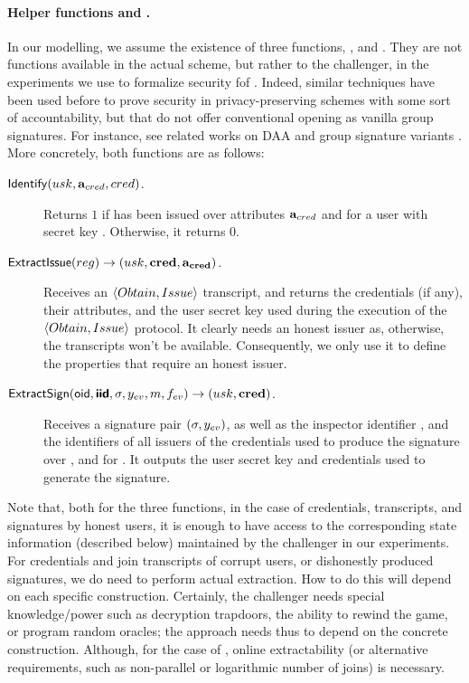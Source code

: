 \paragraph{Helper functions \ExtractIssue and \ExtractSign.} In our modelling,
we assume the existence of three functions, \Identify, \ExtractIssue and
\ExtractSign. They are not functions available in the actual scheme, but rather
to the challenger, in the experiments we use to formalize security fof \UAS.
Indeed, similar techniques have been used before to prove security in
privacy-preserving schemes with some sort of accountability, but that do not
offer conventional opening as vanilla group signatures. For instance, see
related works on DAA \cite{bfg+11,cdl16} and group signature variants
\cite{dl21,fgl21,gl19,lnpy21}. More concretely, both functions are as follows:

\begin{description}
\item[$\mathsf{Identify}(usk,\mathbf{a}_{cred},cred)$.] Returns $1$ if \cred has been
  issued over attributes $\mathbf{a}_{cred}$ and for a user with secret key \usk.
  Otherwise, it returns $0$.
\item[$\mathsf{ExtractIssue}(reg) \rightarrow (usk,\mathbf{cred},\mathbf{a}_{\mathbf{cred}})$.]
  Receives an $\langle Obtain, Issue \rangle$ transcript, and returns the
  credentials (if any), their attributes, and the user secret key used during
  the execution of the $\langle Obtain,Issue\rangle$ protocol. It clearly needs
  an honest issuer as, otherwise, the transcripts won't be available.
  Consequently, we only use it to define the properties that require an honest
  issuer.
\item[$\mathsf{ExtractSign}(\mathsf{oid},\boldsymbol{\mathsf{\mathsf{iid}}},\sigma,y_{ev},m,f_{ev}) \rightarrow (usk,\mathbf{cred})$.]
  Receives a signature pair $(\sigma,y_{ev})$, as well as the inspector identifier
  \oid, and the identifiers of all issuers of the credentials used to produce the
  signature over \msg, and for \feval. It outputs the user secret key
  and credentials used to generate the signature.
\end{description}

Note that, both for the three functions, in the case of credentials,
transcripts, and signatures by honest users, it is enough to have access to the
corresponding state information (described below) maintained by the challenger
in our experiments. For credentials and join transcripts of corrupt users, or
dishonestly produced signatures, we do need to perform actual extraction. How to
do this will depend on each specific construction. Certainly, the challenger
needs special knowledge/power such as decryption trapdoors, the ability to
rewind the game, or program random oracles; the approach needs thus to depend on
the concrete construction. Although, for the case of \ExtractIssue, online
extractability (or alternative requirements, such as non-parallel or logarithmic
number of joins) is necessary. %
 


